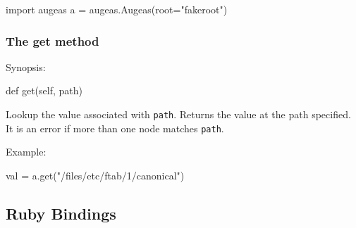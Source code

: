 \begin{python}[]
    import augeas
    a = augeas.Augeas(root="fakeroot")
\end{python}

\subsubsection{The get method}

Synopsis:

\begin{python}[]
    def get(self, path)
\end{python}

Lookup the value associated with \verb!path!. Returns the value at the path specified. It is an error if more than one node matches \verb!path!.

Example:

\begin{python}[]
    val = a.get("/files/etc/ftab/1/canonical")
\end{python}

\subsection{Ruby Bindings}






